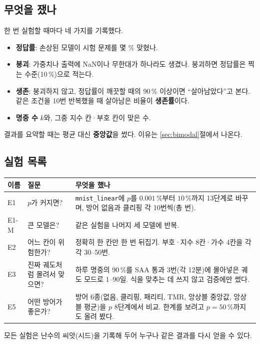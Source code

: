 \documentclass[11pt,a4paper]{article}
\newcommand{\code}[1]{\texttt{#1}}
\begin{document}
\subsection{무엇을 쟀나}
한 번 실험할 때마다 네 가지를 기록했다.
\begin{itemize}[leftmargin=*,nosep]
  \item \textbf{정답률}: 손상된 모델이 시험 문제를 몇 \% 맞혔나.
  \item \textbf{붕괴}: 가중치나 출력에 NaN이나 무한대가 하나라도 생겼나. 붕괴하면 정답률은 찍는 수준(10\,\%)으로 적는다.
  \item \textbf{생존}: 붕괴하지 않고, 정답률이 깨끗할 때의 90\,\% 이상이면 ``살아남았다''고 본다. 같은 조건을 10번 반복했을 때 살아남은 비율이 \textbf{생존률}이다.
  \item \textbf{명중 수} $k$와, 그중 지수 칸·부호 칸이 맞은 수.
\end{itemize}
결과를 요약할 때는 평균 대신 \textbf{중앙값}을 썼다. 이유는 \ref{sec:bimodal}절에서 나온다.

\subsection{실험 목록}
\begin{table}[H]
  \centering\small
  \begin{tabular}{llp{8.6cm}}
    \toprule
    이름 & 질문 & 무엇을 했나 \\
    \midrule
    E1 & $p$가 커지면? & \code{mnist\_linear}에 $p$를 $0.001\,\%$부터 $10\,\%$까지 13단계로 바꾸며, 방어 없음과 클리핑 각 10번씩(총 \NumTrials{}번). \\
    E1-M & 큰 모델은? & 같은 실험을 나머지 세 모델에 반복. \\
    E2 & 어느 칸이 위험한가? & 정확히 한 칸만 한 번 뒤집기. 부호·지수 8칸·가수 4칸을 각각 30--50번. \\
    E3 & 진짜 궤도처럼 몰려서 맞으면? & 하루 명중의 90\,\%를 SAA 통과 3번(각 12분)에 몰아넣은 궤도 모드로 1--90일. 식을 맞추는 데 쓰지 않고 검증에만 썼다. \\
    E5 & 어떤 방어가 좋은가? & 방어 6종(없음, 클리핑, 패리티, TMR, 앙상블 중앙값, 앙상블 평균)을 $p$ 8단계에서 비교. 한계를 보려고 $p=50\,\%$까지도 올려 봤다. \\
    \bottomrule
  \end{tabular}
\end{table}
모든 실험은 난수의 씨앗(시드)을 기록해 두어 누구나 같은 결과를 다시 얻을 수 있다.

\end{document}
